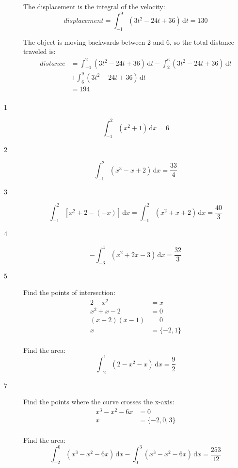 \documentclass{exam}
\begin{document}
\begin{description}
The displacement is the integral of the velocity:
\[
  displacement = \int_{-1}^9 (3t^2 - 24t + 36) \, \mathrm{d}t = 130
\]

The object is moving backwards between 2 and 6, so the total distance traveled is:
\begin{align*}
  distance &= \int_{-1}^2 (3t^2 - 24t + 36) \, \mathrm{d}t - \int_2^6 (3t^2 - 24t + 36) \, \mathrm{d}t \\
  &+ \int_6^9 (3t^2 - 24t + 36) \, \mathrm{d}t \\
  &= 194 \\
\end{align*}


\item[1]
\[
\int_{-1}^2 (x^2 + 1) \, \mathrm{d}x = 6
\]

\item[2]
\[
\int_{-1}^2 (x^3 - x + 2) \, \mathrm{d}x = \frac{33}{4}
\]

\item[3]
\[
\int_{-1}^2 [ x^2 + 2 - (-x) ] \, \mathrm{d}x = \int_{-1}^2 ( x^2 + x + 2) \, \mathrm{d}x = \frac{40}{3}
\]

\item[4]
\[
  - \int_{-3}^1 (x^2 + 2x - 3) \, \mathrm{d}x = \frac{32}{3}
\]

\item[5]
Find the points of intersection:
\begin{align*}
  2 - x^2 &= x \\
  x^2 + x - 2 &= 0 \\
  (x + 2)(x - 1) &= 0 \\
  x &= \{-2, 1\} \\
\end{align*}

Find the area:
\[
  \int_{-2}^1 (2 - x^2 - x) \, \mathrm{d}x = \frac{9}{2}
\]

\item[7]
Find the points where the curve crosses the x-axis:
\begin{align*}
  x^3 - x^2 - 6x &= 0 \\
  x &= \{-2, 0, 3\} \\
\end{align*}

Find the area:
\[
  \int_{-2}^0 (x^3 - x^2 - 6x) \, \mathrm{d}x - \int_0^3 (x^3 - x^2 - 6x) \, \mathrm{d}x = \frac{253}{12}
\]


\end{description}
\end{document}
